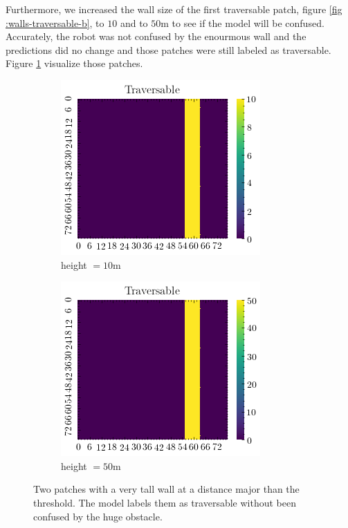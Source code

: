 \documentclass[../document.tex]{subfiles}
\begin{document}
Furthermore, we increased the wall size of the first traversable patch, figure \ref{fig :walls-traversable-b}, to $10$ and to $50$m to see if the model will be confused. Accurately, the robot was not confused by the enourmous wall and the predictions did no change and those patches were still labeled as traversable. Figure \ref{fig : walls-tall} visualize those patches.
\begin{figure}[htbp]
    \centering
    \begin{subfigure}[b]{0.33\textwidth}
        \includegraphics[width=\linewidth]{../img/5/custom_patches/walls_front/big-1-2d.png}
    \caption{height $=10$m}
    \end{subfigure}   
    \begin{subfigure}[b]{0.33\textwidth}
        \includegraphics[width=\linewidth]{../img/5/custom_patches/walls_front/big-2-2d.png}
        \caption{height $=50$m}
    \end{subfigure}   
\caption{Two patches with a very tall wall at a distance major than the threshold. The model labels them as traversable without been confused by the huge obstacle.}    
\label{fig : walls-tall}
\end{figure}
\end{document}
